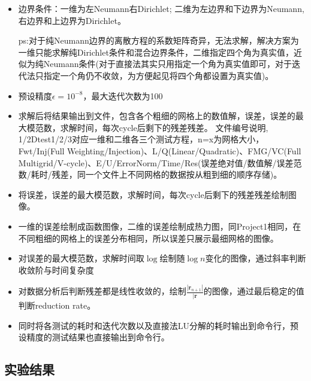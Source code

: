 \documentclass{article}
\begin{document}
\begin{itemize}
    \item 边界条件：一维为左Neumann右Dirichlet; 二维为左边界和下边界为Neumann,右边界和上边界为Dirichlet。
    
    ps:对于纯Neumann边界的离散方程的系数矩阵奇异，无法求解，解决方案为一维只能求解纯Dirichlet条件和混合边界条件，二维指定四个角为真实值，近似为纯Neumann条件(对于直接法其实只用指定一个角为真实值即可，对于迭代法只指定一个角仍不收敛，为方便起见将四个角都设置为真实值)。
    \item 预设精度$\epsilon=10^{-8}$，最大迭代次数为100
    \item 求解后将结果输出到文件，包含各个粗细的网格上的数值解，误差，误差的最大模范数，求解时间，每次cycle后剩下的残差残差。
    文件编号说明, 1/2Dtest1/2/3对应一维和二维各三个测试方程，n=x为网格大小，Fwt/Inj(Full Weighting/Injection)、L/Q(Linear/Quadratic)、FMG/VC(Full Multigrid/V-cycle)、E/U/ErrorNorm/Time/Res(误差绝对值/数值解/误差范数/耗时/残差，同一个文件上不同网格的数据按从粗到细的顺序存储)。
    \item 将误差，误差的最大模范数，求解时间，每次cycle后剩下的残差残差绘制图像。
    \item 一维的误差绘制成函数图像，二维的误差绘制成热力图，同Project1相同，在不同粗细的网格上的误差分布相同，所以误差只展示最细网格的图像。
    \item 对误差的最大模范数，求解时间取$\log$绘制随$\log n$变化的图像，通过斜率判断收敛阶与时间复杂度
    \item 对数据分析后判断残差都是线性收敛的，绘制$\frac{|\mathbf{r}_{n+1}|}{|\mathbf{r}}$的图像，通过最后稳定的值判断reduction rate。
    \item 同时将各测试的耗时和迭代次数以及直接法LU分解的耗时输出到命令行，预设精度的测试结果也直接输出到命令行。
\end{itemize}
\subsection{实验结果}
\end{document}
